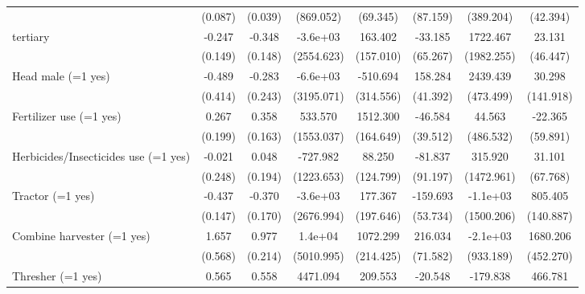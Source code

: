 {\begin{tabular}{l*{7}{c}}
                    &(0.087)         &(0.039)         &(869.052)         &(69.345)         &(87.159)         &(389.204)         &(42.394)         \\
tertiary            &-0.247         &-0.348         &-3.6e+03         &163.402         &-33.185         &1722.467         &23.131         \\
                    &(0.149)         &(0.148)         &(2554.623)         &(157.010)         &(65.267)         &(1982.255)         &(46.447)         \\
Head male (=1 yes)  &-0.489         &-0.283         &-6.6e+03         &-510.694         &158.284\sym{**} &2439.439\sym{**} &30.298         \\
                    &(0.414)         &(0.243)         &(3195.071)         &(314.556)         &(41.392)         &(473.499)         &(141.918)         \\
Fertilizer use (=1 yes)&0.267         &0.358         &533.570         &1512.300\sym{***}&-46.584         &44.563         &-22.365         \\
                    &(0.199)         &(0.163)         &(1553.037)         &(164.649)         &(39.512)         &(486.532)         &(59.891)         \\
Herbicides/Insecticides use (=1 yes)&-0.021         &0.048         &-727.982         &88.250         &-81.837         &315.920         &31.101         \\
                    &(0.248)         &(0.194)         &(1223.653)         &(124.799)         &(91.197)         &(1472.961)         &(67.768)         \\
Tractor (=1 yes)    &-0.437\sym{*}  &-0.370         &-3.6e+03         &177.367         &-159.693\sym{*}  &-1.1e+03         &805.405\sym{***}\\
                    &(0.147)         &(0.170)         &(2676.994)         &(197.646)         &(53.734)         &(1500.206)         &(140.887)         \\
Combine harvester (=1 yes)&1.657\sym{*}  &0.977\sym{**} &1.4e+04\sym{*}  &1072.299\sym{**} &216.034\sym{*}  &-2.1e+03         &1680.206\sym{**} \\
                    &(0.568)         &(0.214)         &(5010.995)         &(214.425)         &(71.582)         &(933.189)         &(452.270)         \\
Thresher (=1 yes)   &0.565\sym{***}&0.558\sym{***}&4471.094\sym{*}  &209.553         &-20.548         &-179.838         &466.781\sym{**} \\

\end{tabular}}
